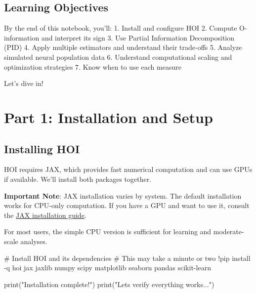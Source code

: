 \documentclass[
  11pt,
  letterpaper,
  oneside,
  openany]{book}
\newenvironment{Shaded}{\begin{snugshade}}{\end{snugshade}}
\newcommand{\BuiltInTok}[1]{\textcolor[rgb]{0.00,0.23,0.31}{#1}}
\newcommand{\CommentTok}[1]{\textcolor[rgb]{0.37,0.37,0.37}{#1}}
\newcommand{\NormalTok}[1]{\textcolor[rgb]{0.00,0.23,0.31}{#1}}
\newcommand{\OperatorTok}[1]{\textcolor[rgb]{0.37,0.37,0.37}{#1}}
\newcommand{\StringTok}[1]{\textcolor[rgb]{0.13,0.47,0.30}{#1}}
\begin{document}
\subsection{Learning Objectives}\label{learning-objectives-1}

By the end of this notebook, you'll: 1. Install and configure HOI 2.
Compute O-information and interpret its sign 3. Use Partial Information
Decomposition (PID) 4. Apply multiple estimators and understand their
trade-offs 5. Analyze simulated neural population data 6. Understand
computational scaling and optimization strategies 7. Know when to use
each measure

Let's dive in! 🚀

\section{Part 1: Installation and
Setup}\label{part-1-installation-and-setup}

\subsection{Installing HOI}\label{installing-hoi}

HOI requires JAX, which provides fast numerical computation and can use
GPUs if available. We'll install both packages together.

\textbf{Important Note}: JAX installation varies by system. The default
installation works for CPU-only computation. If you have a GPU and want
to use it, consult the
\href{https://github.com/google/jax\#installation}{JAX installation
guide}.

For most users, the simple CPU version is sufficient for learning and
moderate-scale analyses.

\begin{Shaded}
\begin{Highlighting}[]
\CommentTok{\# Install HOI and its dependencies}
\CommentTok{\# This may take a minute or two}
\OperatorTok{!}\NormalTok{pip install }\OperatorTok{{-}}\NormalTok{q hoi jax jaxlib numpy scipy matplotlib seaborn pandas scikit}\OperatorTok{{-}}\NormalTok{learn}

\BuiltInTok{print}\NormalTok{(}\StringTok{"Installation complete!"}\NormalTok{)}
\BuiltInTok{print}\NormalTok{(}\StringTok{"Let\textquotesingle{}s verify everything works..."}\NormalTok{)}
\end{Highlighting}
\end{Shaded}
\end{document}
